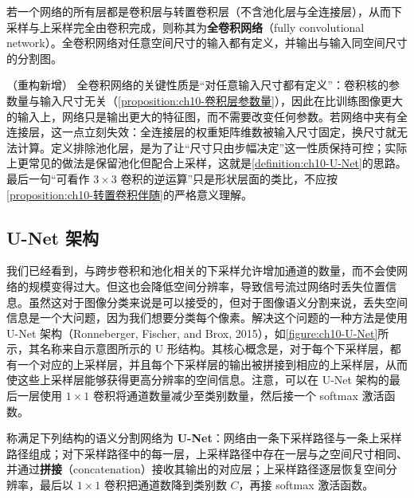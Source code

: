 \documentclass[../../main.tex]{subfiles}
\begin{document}
\begin{definition}[全卷积网络]\label{definition:ch10-全卷积网络}
若一个网络的所有层都是卷积层与转置卷积层（不含池化层与全连接层），从而下采样与上采样完全由卷积完成，则称其为\textbf{全卷积网络}（fully convolutional network）。全卷积网络对任意空间尺寸的输入都有定义，并输出与输入同空间尺寸的分割图。
\end{definition}

\begin{remark}（重构新增）
全卷积网络的关键性质是“对任意输入尺寸都有定义”：卷积核的参数量与输入尺寸无关（\cref{proposition:ch10-卷积层参数量}），因此在比训练图像更大的输入上，网络只是输出更大的特征图，而不需要改变任何参数。若网络中夹有全连接层，这一点立刻失效：全连接层的权重矩阵维数被输入尺寸固定，换尺寸就无法计算。定义排除池化层，是为了让“尺寸只由步幅决定”这一性质保持可控；实际上更常见的做法是保留池化但配合上采样，这就是\cref{definition:ch10-U-Net}的思路。最后一句“可看作 $3\times3$ 卷积的逆运算”只是形状层面的类比，不应按\cref{proposition:ch10-转置卷积伴随}的严格意义理解。
\end{remark}

\subsection{U-Net 架构}\label{subsection:ch10-U-Net架构}

我们已经看到，与跨步卷积和池化相关的下采样允许增加通道的数量，而不会使网络的规模变得过大。但这也会降低空间分辨率，导致信号流过网络时丢失位置信息。虽然这对于图像分类来说是可以接受的，但对于图像语义分割来说，丢失空间信息是一个大问题，因为我们想要分类每个像素。解决这个问题的一种方法是使用 U-Net 架构（Ronneberger, Fischer, and Brox, 2015），如\cref{figure:ch10-U-Net}所示，其名称来自示意图所示的 U 形结构。其核心概念是，对于每个下采样层，都有一个对应的上采样层，并且每个下采样层的输出被拼接到相应的上采样层，从而使这些上采样层能够获得更高分辨率的空间信息。注意，可以在 U-Net 架构的最后一层使用 $1\times 1$ 卷积将通道数量减少至类别数量，然后接一个 softmax 激活函数。

\begin{definition}[U-Net]\label{definition:ch10-U-Net}
称满足下列结构的语义分割网络为 \textbf{U-Net}：网络由一条下采样路径与一条上采样路径组成；对下采样路径中的每一层，上采样路径中存在一层与之空间尺寸相同、并通过\textbf{拼接}（concatenation）接收其输出的对应层；上采样路径逐层恢复空间分辨率，最后以 $1\times 1$ 卷积把通道数降到类别数 $C$，再接 softmax 激活函数。
\end{definition}
\end{document}
